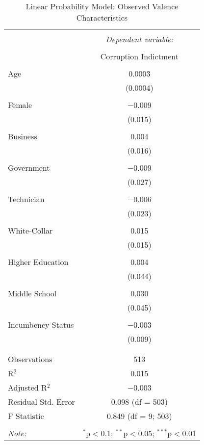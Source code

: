\documentclass{article}
\begin{document}
  \begin{table}[!htbp] \centering 
    \caption{Linear Probability Model: Observed Valence Characteristics} 
    \label{} 
  \begin{tabular}{@{\extracolsep{5pt}}lc} 
  \\[-1.8ex]\hline 
  \hline \\[-1.8ex] 
   & \multicolumn{1}{c}{\textit{Dependent variable:}} \\ 
  \cline{2-2} 
  \\[-1.8ex] & Corruption Indictment \\ 
  \hline \\[-1.8ex] 
   Age & 0.0003 \\ 
    & (0.0004) \\ 
    & \\ 
   Female & $-$0.009 \\ 
    & (0.015) \\ 
    & \\ 
   Business & 0.004 \\ 
    & (0.016) \\ 
    & \\ 
   Government & $-$0.009 \\ 
    & (0.027) \\ 
    & \\ 
   Technician & $-$0.006 \\ 
    & (0.023) \\ 
    & \\ 
   White-Collar & 0.015 \\ 
    & (0.015) \\ 
    & \\ 
   Higher Education & 0.004 \\ 
    & (0.044) \\ 
    & \\ 
   Middle School & 0.030 \\ 
    & (0.045) \\ 
    & \\ 
   Incumbency Status & $-$0.003 \\ 
    & (0.009) \\ 
    & \\ 
  \hline \\[-1.8ex] 
  Observations & 513 \\ 
  R$^{2}$ & 0.015 \\ 
  Adjusted R$^{2}$ & $-$0.003 \\ 
  Residual Std. Error & 0.098 (df = 503) \\ 
  F Statistic & 0.849 (df = 9; 503) \\ 
  \hline 
  \hline \\[-1.8ex] 
  \textit{Note:}  & \multicolumn{1}{r}{$^{*}$p$<$0.1; $^{**}$p$<$0.05; $^{***}$p$<$0.01} \\ 
  \end{tabular} 
  \end{table} 
\end{document}
